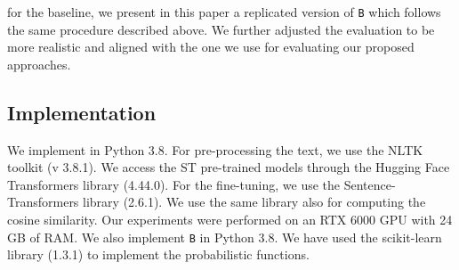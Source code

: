 
 for the baseline, we present in this paper a replicated version of \texttt{B} which follows the same procedure described above.  We further adjusted the evaluation to be more realistic and aligned with the one we use for evaluating our proposed approaches.

\subsection{Implementation}
We implement \kashif in Python 3.8. For pre-processing the text, we use the NLTK toolkit (v 3.8.1). 
We access the ST pre-trained models through the
Hugging Face Transformers library (4.44.0). For the fine-tuning, we use the Sentence-Transformers library (2.6.1). We use the same library also for computing the cosine similarity.  
Our experiments were performed on an RTX 6000 GPU with 24 GB of RAM.
%
%
We also implement \texttt{B} in Python 3.8. We have used the scikit-learn library (1.3.1) to implement the probabilistic functions. 



